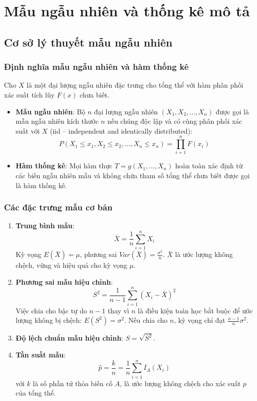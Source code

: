 \documentclass[12pt,a4paper]{report}
\begin{document}
\chapter{Mẫu ngẫu nhiên và thống kê mô tả}
\section{Cơ sở lý thuyết mẫu ngẫu nhiên}
\subsection{Định nghĩa mẫu ngẫu nhiên và hàm thống kê}
Cho $X$ là một đại lượng ngẫu nhiên đặc trưng cho tổng thể với hàm phân phối xác suất tích lũy $F(x)$ chưa biết.
\begin{itemize}
    \item \textbf{Mẫu ngẫu nhiên}: Bộ $n$ đại lượng ngẫu nhiên $(X_1, X_2, \dots, X_n)$ được gọi là mẫu ngẫu nhiên kích thước $n$ nếu chúng độc lập và có cùng phân phối xác suất với $X$ (iid -- independent and identically distributed):
    \[ P(X_1 \le x_1, X_2 \le x_2, \dots, X_n \le x_n) = \prod_{i=1}^n F(x_i) \]
    \item \textbf{Hàm thống kê}: Mọi hàm thực $T = g(X_1, \dots, X_n)$ hoàn toàn xác định từ các biến ngẫu nhiên mẫu và không chứa tham số tổng thể chưa biết được gọi là hàm thống kê.
\end{itemize}

\subsection{Các đặc trưng mẫu cơ bản}
\begin{enumerate}
    \item \textbf{Trung bình mẫu}:
    \[ \bar{X} = \frac{1}{n}\sum_{i=1}^n X_i \]
    Kỳ vọng $E(\bar{X}) = \mu$, phương sai $Var(\bar{X}) = \frac{\sigma^2}{n}$. $\bar{X}$ là ước lượng không chệch, vững và hiệu quả cho kỳ vọng $\mu$.
    
    \item \textbf{Phương sai mẫu hiệu chỉnh}:
    \[ S^2 = \frac{1}{n-1}\sum_{i=1}^n (X_i - \bar{X})^2 \]
    Việc chia cho bậc tự do $n - 1$ thay vì $n$ là điều kiện toán học bắt buộc để ước lượng không bị chệch: $E(S^2) = \sigma^2$. Nếu chia cho $n$, kỳ vọng chỉ đạt $\frac{n-1}{n}\sigma^2$.
    
    \item \textbf{Độ lệch chuẩn mẫu hiệu chỉnh}: $S = \sqrt{S^2}$.
    
    \item \textbf{Tần suất mẫu}:
    \[ \hat{p} = \frac{k}{n} = \frac{1}{n}\sum_{i=1}^n I_A(X_i) \]
    với $k$ là số phần tử thỏa biến cố $A$, là ước lượng không chệch cho xác suất $p$ của tổng thể.
\end{enumerate}
\end{document}
